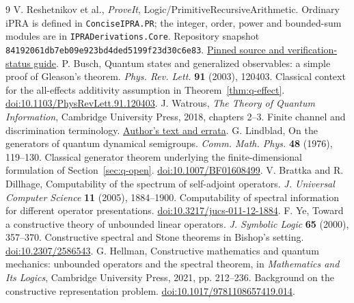 \begin{thebibliography}{9}
 V. Reshetnikov et al., \emph{ProveIt}, Logic/PrimitiveRecursiveArithmetic. Ordinary iPRA is defined in \texttt{ConciseIPRA.PR}; the integer, order, power and bounded-sum modules are in \texttt{IPRADerivations.Core}. Repository snapshot \texttt{84192061db7eb09e923bd4ded5199f23d30c6e83}. \href{https://github.com/VladimirReshetnikov/ProveIt/tree/84192061db7eb09e923bd4ded5199f23d30c6e83/Logic/PrimitiveRecursiveArithmetic}{Pinned source and verification-status guide}.
 P. Busch, Quantum states and generalized observables: a simple proof of Gleason's theorem. \emph{Phys. Rev. Lett.} \textbf{91} (2003), 120403. Classical context for the all-effects additivity assumption in Theorem~\ref{thm:q-effect}. \href{https://doi.org/10.1103/PhysRevLett.91.120403}{doi:10.1103/PhysRevLett.91.120403}.
 J. Watrous, \emph{The Theory of Quantum Information}, Cambridge University Press, 2018, chapters 2--3. Finite channel and discrimination terminology. \href{https://cs.uwaterloo.ca/~watrous/TQI/}{Author's text and errata}.
 G. Lindblad, On the generators of quantum dynamical semigroups. \emph{Comm. Math. Phys.} \textbf{48} (1976), 119--130. Classical generator theorem underlying the finite-dimensional formulation of Section~\ref{sec:q-open}. \href{https://doi.org/10.1007/BF01608499}{doi:10.1007/BF01608499}.
 V. Brattka and R. Dillhage, Computability of the spectrum of self-adjoint operators. \emph{J. Universal Computer Science} \textbf{11} (2005), 1884--1900. Computability of spectral information for different operator presentations. \href{https://doi.org/10.3217/jucs-011-12-1884}{doi:10.3217/jucs-011-12-1884}.
 F. Ye, Toward a constructive theory of unbounded linear operators. \emph{J. Symbolic Logic} \textbf{65} (2000), 357--370. Constructive spectral and Stone theorems in Bishop's setting. \href{https://doi.org/10.2307/2586543}{doi:10.2307/2586543}.
 G. Hellman, Constructive mathematics and quantum mechanics: unbounded operators and the spectral theorem, in \emph{Mathematics and Its Logics}, Cambridge University Press, 2021, pp. 212--236. Background on the constructive representation problem. \href{https://doi.org/10.1017/9781108657419.014}{doi:10.1017/9781108657419.014}.
\end{thebibliography}
